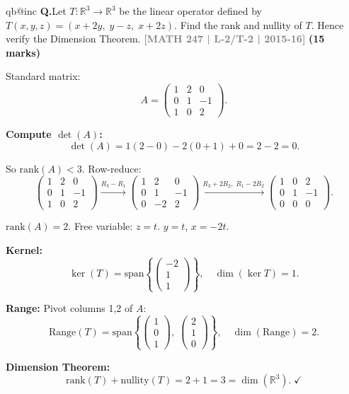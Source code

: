 \documentclass[12pt,a3paper]{article}
\makeatletter
\newcommand{\yr}[1]{\hfill\textcolor{gray}{\small\textbf{[#1]}}}
\newcommand{\mk}[1]{\textcolor{orange!70!black}{\small\textbf{(#1 marks)}}}
\newcounter{qnum}
\newcommand{\Q}[1]{%
  \csname qb@inc\endcsname
  \needspace{4\baselineskip}
  \refstepcounter{qnum}
  \vspace{6pt}
  \noindent\textbf{Q\theqnum.}\enspace #1\par
}
\makeatother
\begin{document}
\Q{Let $T: \mathbb{R}^3 \to \mathbb{R}^3$ be the linear operator defined by $T(x,y,z) = (x+2y,\; y-z,\; x+2z)$. Find the rank and nullity of $T$. Hence verify the Dimension Theorem.
\yr{MATH 247 | L-2/T-2 | 2015-16} \mk{15}}

\begin{tcolorbox}[enhanced,breakable,
  colback=cF!4,colframe=cF,boxrule=0.8pt,arc=5pt,
  title={\textbf{Answer --- $T(x,y,z)=(x+2y,\;y-z,\;x+2z)$: Rank, Nullity, Dimension Theorem}},
  fonttitle=\bfseries\color{white},colbacktitle=cF]

Standard matrix:
\[
A=\begin{pmatrix}1&2&0\\0&1&-1\\1&0&2\end{pmatrix}.
\]

\textbf{Compute $\det(A)$:}
\[
\det(A)=1(2-0)-2(0+1)+0=2-2=0.
\]

So $\mathrm{rank}(A)<3$. Row-reduce:
\[
\begin{pmatrix}1&2&0\\0&1&-1\\1&0&2\end{pmatrix}
\xrightarrow{R_3-R_1}
\begin{pmatrix}1&2&0\\0&1&-1\\0&-2&2\end{pmatrix}
\xrightarrow{R_3+2R_2,\;R_1-2R_2}
\begin{pmatrix}1&0&2\\0&1&-1\\0&0&0\end{pmatrix}.
\]

$\mathrm{rank}(A)=2$. Free variable: $z=t$. $y=t$, $x=-2t$.

\textbf{Kernel:}
\[
\ker(T)=\mathrm{span}\!\left\{\begin{pmatrix}-2\\1\\1\end{pmatrix}\right\},\quad\dim(\ker T)=1.
\]

\textbf{Range:} Pivot columns 1,2 of $A$:
\[
\mathrm{Range}(T)=\mathrm{span}\!\left\{\begin{pmatrix}1\\0\\1\end{pmatrix},\;\begin{pmatrix}2\\1\\0\end{pmatrix}\right\},\quad\dim(\mathrm{Range})=2.
\]

\textbf{Dimension Theorem:}
\[
\mathrm{rank}(T)+\mathrm{nullity}(T)=2+1=3=\dim(\mathbb{R}^3).\;\checkmark
\]

\end{tcolorbox}
\end{document}
